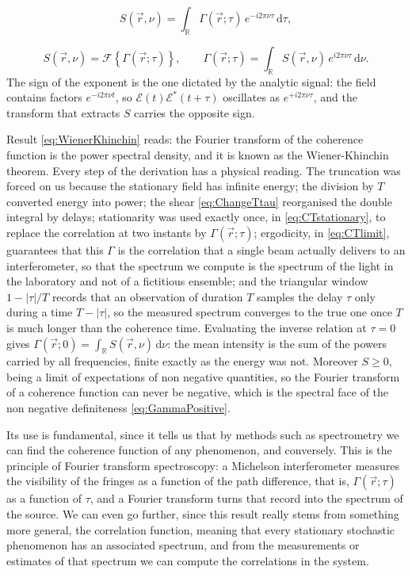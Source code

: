 		\begin{equation}
			S(\vec{r},\nu) = \int_{\mathbb{R}}\Gamma(\vec{r};\tau)\,e^{-i2\pi\nu\tau}\,\mathrm{d}\tau ,
		\end{equation}

		\begin{equation}\label{eq:WienerKhinchin}
			\boxed{S(\vec{r},\nu) = \mathcal{F}\left\{ \Gamma(\vec{r};\tau) \right\}, \qquad \Gamma(\vec{r};\tau) = \int_{\mathbb{R}}S(\vec{r},\nu)\,e^{i2\pi\nu\tau}\,\mathrm{d}\nu }.
		\end{equation}
		The sign of the exponent is the one dictated by the analytic signal: the field contains
		factors $e^{-i2\pi\nu t}$, so $\mathcal{E}(t)\mathcal{E}^{*}(t+\tau)$ oscillates as
		$e^{+i2\pi\nu\tau}$, and the transform that extracts $S$ carries the opposite sign.

		Result \eqref{eq:WienerKhinchin} reads: the Fourier transform of the coherence function
		is the power spectral density, and it is known as the Wiener-Khinchin theorem. Every step
		of the derivation has a physical reading. The truncation was forced on us because the
		stationary field has infinite energy; the division by $T$ converted energy into power;
		the shear \eqref{eq:ChangeTtau} reorganised the double integral by delays;
		stationarity was used exactly once, in \eqref{eq:CTstationary}, to replace the
		correlation at two instants by $\Gamma(\vec{r};\tau)$; ergodicity, in
		\eqref{eq:CTlimit}, guarantees that this $\Gamma$ is the correlation that a single beam
		actually delivers to an interferometer, so that the spectrum we compute is the spectrum
		of the light in the laboratory and not of a fictitious ensemble; and the triangular
		window $1-|\tau|/T$ records that an observation of duration $T$ samples the delay $\tau$
		only during a time $T-|\tau|$, so the measured spectrum converges to the true one once
		$T$ is much longer than the coherence time. Evaluating the inverse relation at $\tau=0$ gives
		$\Gamma(\vec{r};0)=\int_{\mathbb{R}}S(\vec{r},\nu)\,\mathrm{d}\nu$: the mean intensity
		is the sum of the powers carried by all frequencies, finite exactly as the energy was
		not. Moreover $S\geq0$, being a limit of expectations of non negative quantities, so the
		Fourier transform of a coherence function can never be negative, which is the spectral
		face of the non negative definiteness \eqref{eq:GammaPositive}.

		Its use is fundamental, since it tells us that by methods such as spectrometry we can find
		the coherence function of any phenomenon, and conversely. This is the principle of Fourier
		transform spectroscopy: a Michelson interferometer measures the visibility of the fringes
		as a function of the path difference, that is, $\Gamma(\vec{r};\tau)$ as a function of
		$\tau$, and a Fourier transform turns that record into the spectrum of the source. We can
		even go further, since this result really stems from something more general, the
		correlation function, meaning that every stationary stochastic phenomenon has an
		associated spectrum, and from the measurements or estimates of that spectrum we can
		compute the correlations in the system.

